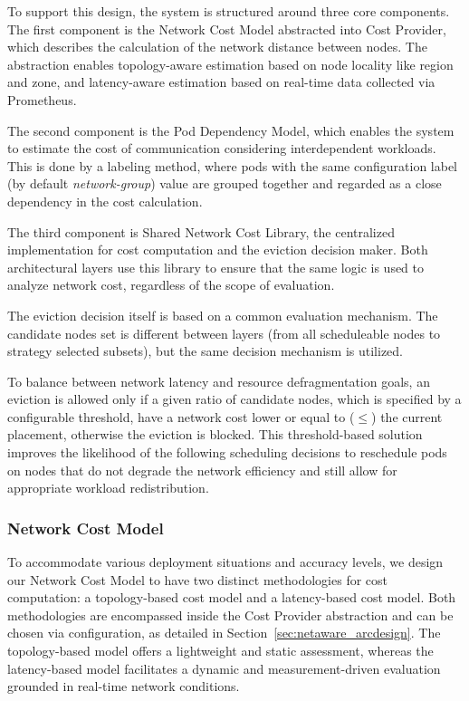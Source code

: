 To support this design, the system is structured around three core components. The first component is the Network Cost Model abstracted into Cost Provider, which describes the calculation of the network distance between nodes. The abstraction enables topology-aware estimation based on node locality like region and zone, and latency-aware estimation based on real-time data collected via Prometheus.

The second component is the Pod Dependency Model, which enables the system to estimate the cost of communication considering interdependent workloads. This is done by a labeling method, where pods with the same configuration label (by default \textit{network-group}) value are grouped together and regarded as a close dependency in the cost calculation.

The third component is Shared Network Cost Library, the centralized implementation for cost computation and the eviction decision maker. Both architectural layers use this library to ensure that the same logic is used to analyze network cost, regardless of the scope of evaluation.

The eviction decision itself is based on a common evaluation mechanism. The candidate nodes set is different between layers (from all scheduleable nodes to strategy selected subsets), but the same decision mechanism is utilized.

To balance between network latency and resource defragmentation goals, an eviction is allowed only if a given ratio of candidate nodes, which is specified by a configurable threshold, have a network cost lower or equal to ($\leq$) the current placement, otherwise the eviction is blocked. This threshold-based solution improves the likelihood of the following scheduling decisions to reschedule pods on nodes that do not degrade the network efficiency and still allow for appropriate workload redistribution.

\subsubsection{Network Cost Model}
\label{sec:netaware_costmodel}
To accommodate various deployment situations and accuracy levels, we design our Network Cost Model to have two distinct methodologies for cost computation: a topology-based cost model and a latency-based cost model. Both methodologies are encompassed inside the Cost Provider abstraction and can be chosen via configuration, as detailed in Section~\ref{sec:netaware_arcdesign}. The topology-based model offers a lightweight and static assessment, whereas the latency-based model facilitates a dynamic and measurement-driven evaluation grounded in real-time network conditions.
